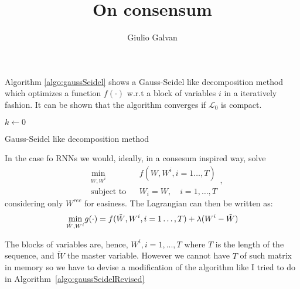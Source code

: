 \documentclass{article}
\title{On consensum}
\author{Giulio Galvan}
\begin{document}
	\maketitle

Algorithm \ref{algo:gaussSeidel} shows a Gauss-Seidel like decomposition method which optimizes a function $f(\cdot)$ w.r.t a block of variables $i$ in a iteratively fashion. It can be shown that the algorithm converges if $\mathcal{L}_0$ is compact.

\begin{algorithm}[]
	$k \gets 0$\\
	\caption{Gauss-Seidel like decomposition method}
	\label{algo:gaussSeidel}
\end{algorithm}

In the case fo RNNs we would, ideally, in a consesum inspired way, solve
\begin{equation*}
\begin{aligned}
& \underset{W,W^i}{\text{min}}
& & f(W,W^i, i=1\ldots,T) \\
& \text{subject to}
& & W_i = W,\quad i=1,\ldots,T
\end{aligned},
\end{equation*}
considering only $W^{rec}$ for easiness. 
The Lagrangian can then be written as:
\begin{equation}
	\underset{\tilde{W},W^i}{\text{min}} g(\cdot) = f(\tilde{W}, W^i, i=1\ldots,T) + \lambda (W^i-\tilde{W})\\
\end{equation}

The blocks of variables are, hence,  $W^i, i=1,...,T$ where $T$ is the length of the sequence, and $\tilde{W}$ the master variable. However we cannot have $T$ of such matrix in memory so we have to devise a modification of the algorithm like I tried to do in Algorithm~\ref{algo:gaussSeidelRevised} 
\end{document}

